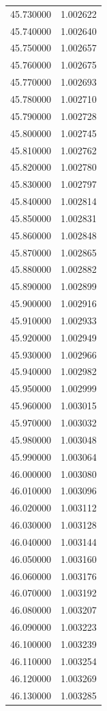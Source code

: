 \begin{tabular}{rr}
45.730000 & 1.002622 \\
45.740000 & 1.002640 \\
45.750000 & 1.002657 \\
45.760000 & 1.002675 \\
45.770000 & 1.002693 \\
45.780000 & 1.002710 \\
45.790000 & 1.002728 \\
45.800000 & 1.002745 \\
45.810000 & 1.002762 \\
45.820000 & 1.002780 \\
45.830000 & 1.002797 \\
45.840000 & 1.002814 \\
45.850000 & 1.002831 \\
45.860000 & 1.002848 \\
45.870000 & 1.002865 \\
45.880000 & 1.002882 \\
45.890000 & 1.002899 \\
45.900000 & 1.002916 \\
45.910000 & 1.002933 \\
45.920000 & 1.002949 \\
45.930000 & 1.002966 \\
45.940000 & 1.002982 \\
45.950000 & 1.002999 \\
45.960000 & 1.003015 \\
45.970000 & 1.003032 \\
45.980000 & 1.003048 \\
45.990000 & 1.003064 \\
46.000000 & 1.003080 \\
46.010000 & 1.003096 \\
46.020000 & 1.003112 \\
46.030000 & 1.003128 \\
46.040000 & 1.003144 \\
46.050000 & 1.003160 \\
46.060000 & 1.003176 \\
46.070000 & 1.003192 \\
46.080000 & 1.003207 \\
46.090000 & 1.003223 \\
46.100000 & 1.003239 \\
46.110000 & 1.003254 \\
46.120000 & 1.003269 \\
46.130000 & 1.003285 \\

\end{tabular}
